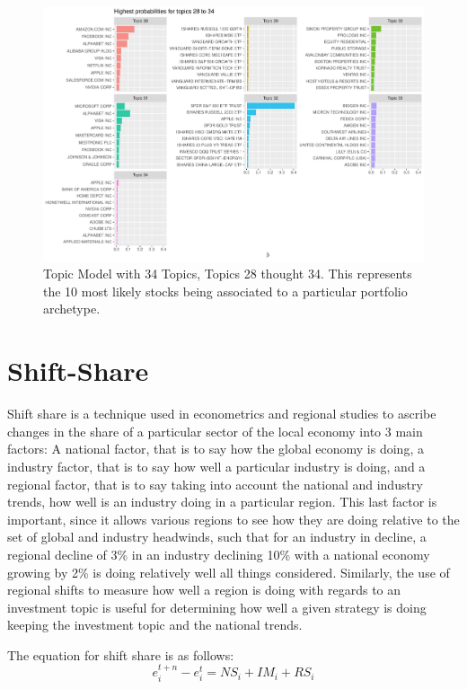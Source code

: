 \begin{figure}
	\centering
	\includegraphics[width=1\linewidth]{Figures/ChapterV/LDA34_28_34}
	\caption[Topic Model with 34 Topics, Topics 28 thought 34]{Topic Model with 34 Topics, Topics 28 thought 34. This represents the 10 most likely stocks being associated to a particular portfolio archetype.}
	\label{fig:lda342834}
\end{figure}
	
\section{Shift-Share}

Shift share is a technique used in econometrics and regional studies to ascribe changes in the share of a particular sector of the local economy into 3 main factors: A national factor, that is to say how the global economy is doing, a industry factor, that is to say how well a particular industry is doing, and a regional factor, that is to say taking into account the national and industry trends, how well is an industry doing in a particular region.  This last factor is important, since it allows various regions to see how they are doing relative to the set of global and industry headwinds, such that for an industry in decline, a regional decline of 3\% in an industry declining 10\% with a national economy growing by 2\% is doing relatively well all things considered.  Similarly, the use of regional shifts to measure how well a region is doing with regards to an investment topic is useful for determining how well a given strategy is doing keeping the investment topic and the national trends. 

The equation for shift share is as follows:
\begin{equation}
   e^{t+n}_{i} - e^{t}_{i} = NS_{i} + IM_{i} + RS_{i}
    \label{Eq:Shft_share}
\end{equation}

